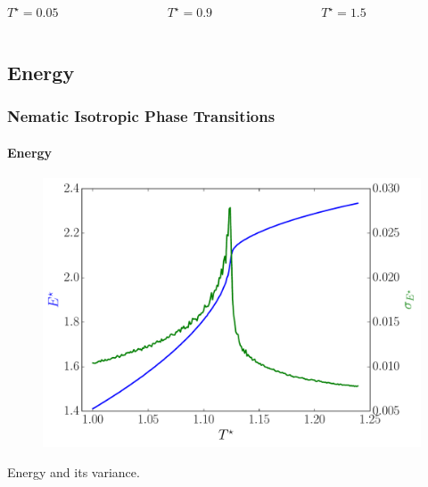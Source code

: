 \documentclass{beamer}
\begin{document}
\begin{frame}
\begin{columns}
    \begin{column}{3cm}
    	\center $T^\star =  0.05$
	\end{column}

	\begin{column}{3cm}
    	\center $T^\star =  0.9$
	\end{column}
	
	\begin{column}{3cm}
    	\center $T^\star =  1.5$
	\end{column}
\end{columns}

\end{frame}

\subsection{Energy}
\begin{frame}
	\frametitle{Nematic Isotropic Phase Transitions}
	\framesubtitle{Energy}

\begin{figure}
\includegraphics[scale=0.48]{figures/local_energie.pdf}
\end{figure}
\vspace{-0.6cm}
\center Energy and its variance.
\end{frame}
\end{document}
